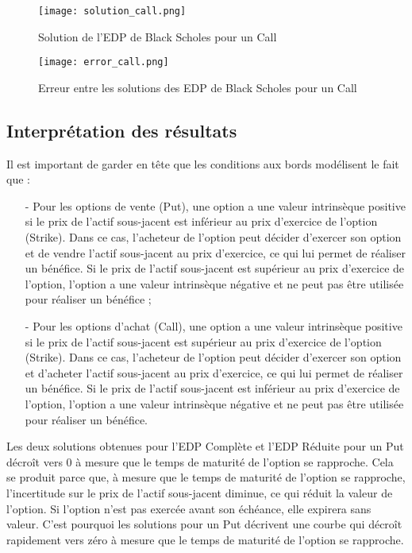 \documentclass[11pt,a4paper]{article}
\begin{document}
\begin{figure}[!ht]
    \centering
    \texttt{[image: solution\_call.png]}
    \caption{Solution de l'EDP de Black Scholes pour un Call}
\end{figure}

\vspace{0.5cm}

\begin{figure}[!ht]
    \centering
    \texttt{[image: error\_call.png]}
    \caption{Erreur entre les solutions des EDP de Black Scholes pour un Call}
\end{figure}

\newpage

\subsection{Interprétation des résultats}

\noindent
Il est important de garder en tête que les conditions aux bords modélisent le fait que :\\

\begin{itemize}
    \item[-] Pour les options de vente (Put), une option a une valeur intrinsèque positive si le prix de l'actif sous-jacent est inférieur au prix d'exercice de l'option (Strike). Dans ce cas, l'acheteur de l'option peut décider d'exercer son option et de vendre l'actif sous-jacent au prix d'exercice, ce qui lui permet de réaliser un bénéfice. Si le prix de l'actif sous-jacent est supérieur au prix d'exercice de l'option, l'option a une valeur intrinsèque négative et ne peut pas être utilisée pour réaliser un bénéfice ;\\
    
    \item[-] Pour les options d'achat (Call), une option a une valeur intrinsèque positive si le prix de l'actif sous-jacent est supérieur au prix d'exercice de l'option (Strike). Dans ce cas, l'acheteur de l'option peut décider d'exercer son option et d'acheter l'actif sous-jacent au prix d'exercice, ce qui lui permet de réaliser un bénéfice. Si le prix de l'actif sous-jacent est inférieur au prix d'exercice de l'option, l'option a une valeur intrinsèque négative et ne peut pas être utilisée pour réaliser un bénéfice.\\
\end{itemize}

Les deux solutions obtenues pour l'EDP Complète et l'EDP Réduite pour un Put décroît vers 0 à mesure que le temps de maturité de l'option se rapproche. Cela se produit parce que, à mesure que le temps de maturité de l'option se rapproche, l'incertitude sur le prix de l'actif sous-jacent diminue, ce qui réduit la valeur de l'option. Si l'option n'est pas exercée avant son échéance, elle expirera sans valeur. C'est pourquoi les solutions pour un Put décrivent une courbe qui décroît rapidement vers zéro à mesure que le temps de maturité de l'option se rapproche.\\
\end{document}
